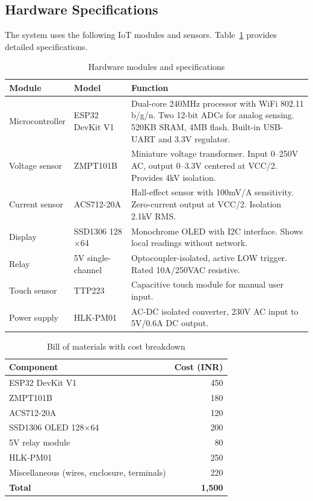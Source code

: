 \documentclass[12pt, a4paper]{article}
\begin{document}
	\subsection{Hardware Specifications}
	
	The system uses the following IoT modules and sensors. Table~\ref{tab:hardware} provides detailed specifications.
	
	\begin{table}[H]
		\centering
		\caption{Hardware modules and specifications}
		\label{tab:hardware}
		\vspace{6pt}
		\begin{tabular}{|l|l|p{6.5cm}|}
			\hline
			\textbf{Module} & \textbf{Model} & \textbf{Function} \\
			\hline
			Microcontroller & ESP32 DevKit V1 & Dual-core 240MHz processor with WiFi 802.11 b/g/n. Two 12-bit ADCs for analog sensing. 520KB SRAM, 4MB flash. Built-in USB-UART and 3.3V regulator. \\
			\hline
			Voltage sensor & ZMPT101B & Miniature voltage transformer. Input 0--250V AC, output 0--3.3V centered at VCC/2. Provides 4kV isolation. \\
			\hline
			Current sensor & ACS712-20A & Hall-effect sensor with 100mV/A sensitivity. Zero-current output at VCC/2. Isolation 2.1kV RMS. \\
			\hline
			Display & SSD1306 128$\times$64 & Monochrome OLED with I2C interface. Shows local readings without network. \\
			\hline
			Relay & 5V single-channel & Optocoupler-isolated, active LOW trigger. Rated 10A/250VAC resistive. \\
			\hline
			Touch sensor & TTP223 & Capacitive touch module for manual user input. \\
			\hline
			Power supply & HLK-PM01 & AC-DC isolated converter, 230V AC input to 5V/0.6A DC output. \\
			\hline
		\end{tabular}
	\end{table}
	
	\begin{table}[H]
		\centering
		\caption{Bill of materials with cost breakdown}
		\label{tab:bom}
		\vspace{6pt}
		\begin{tabular}{|l|r|}
			\hline
			\textbf{Component} & \textbf{Cost (INR)} \\
			\hline
			ESP32 DevKit V1 & 450 \\
			ZMPT101B & 180 \\
			ACS712-20A & 120 \\
			SSD1306 OLED 128$\times$64 & 200 \\
			5V relay module & 80 \\
			HLK-PM01 & 250 \\
			Miscellaneous (wires, enclosure, terminals) & 220 \\
			\hline
			\textbf{Total} & \textbf{1,500} \\
			\hline
		\end{tabular}
	\end{table}
	
\end{document}
